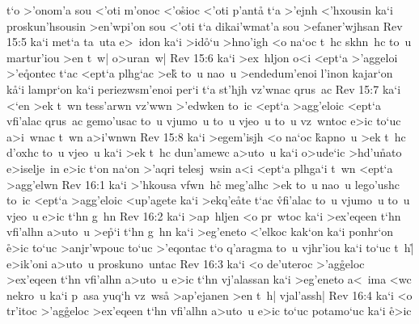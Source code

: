t`o
>'onom'a
sou
<'oti
m'onoc
<'o\r{s}ioc
<'oti
p'anta\r{}
t`a
>'ejnh
<'hxousin
ka`i
proskun'hsousin
>en'wpi'on
sou
<'oti
t`a
dikai'wmat'a
sou
>efaner'wjhsan\bibvsend
\vs Rev 15:5
ka`i
met`a
ta~uta
e>~idon
ka`i
>id\r{o}`u
>hno'igh
<o
na`oc
t~hc
skhn~hc
to~u
martur'iou
>en
t~w|
o>uran~w|\bibvsend
\vs Rev 15:6
ka`i
>ex~hljon
o<i
<ept`a
>'aggeloi
>'e\r{q}ontec
t`ac
<ept`a
plhg`ac
>ek\r{}
to~u
nao~u
>endedum'enoi
l'inon
kajar`on
k\r{a}`i
lampr`on
ka`i
periezwsm'enoi
per`i
t`a
st'hjh
vz'wnac
qrus~ac\bibvsend
\vs Rev 15:7
ka`i
<`en
>ek
t~wn
tess'arwn
vz'wwn
>'edwken
to~ic
<ept`a
>agg'eloic
<ept`a
vfi'alac
qrus~ac
gemo'usac
to~u
vjumo~u
to~u
vjeo~u
to~u
vz~wntoc
e>ic
to`uc
a>i~wnac
t~wn
a>i'wnwn\bibvsend
\vs Rev 15:8
ka`i
>egem'isjh
<o
na`oc
\r{k}apno~u
>ek
t~hc
d'oxhc
to~u
vjeo~u
ka`i
>ek
t~hc
dun'amewc
a>uto~u
ka`i
o>ude`ic
>hd'u\r{n}ato
e>iselje~in
e>ic
t`on
na`on
>'aqri
telesj~wsin
a<i
<ept`a
plhga`i
t~wn
<ept`a
>agg'elwn\bibvsend
\vs Rev 16:1
ka`i
>'hkousa
vfwn~hc\r{}
meg'alhc
>ek
to~u
nao~u
lego'ushc
to~ic
<ept`a
>agg'eloic
<up'agete
ka`i
>ekq'e\r{a}te
t`ac
\r{vf}i'alac
to~u
vjumo~u
to~u
vjeo~u
e>ic
t`hn
g~hn\bibvsend
\vs Rev 16:2
ka`i
>ap~hljen
<o
pr~wtoc
ka`i
>ex'eqeen
t`hn
vfi'alhn
a>uto~u
>e\r{p}`i
t`hn
g~hn
ka`i
>eg'eneto
<'elkoc
kak`on
ka`i
ponhr`on
\r{e}>ic
to`uc
>anjr'wpouc
to`uc
>'eqontac
t`o
q'aragma
to~u
vjhr'iou
ka`i
to`uc
t~h|\r{}
e>ik'oni
a>uto~u
proskuno~untac\bibvsend
\vs Rev 16:3
ka`i
<o
de'uteroc
>'ag\r{g}eloc
>ex'eqeen
t`hn
vfi'alhn
a>uto~u
e>ic
t`hn
vj'alassan
ka`i
>eg'eneto
a<~ima
<wc
nekro~u
ka`i
p~asa
yuq`h
vz~wsa\r{}
>ap'ejanen
>en
t~h|
vjal'assh|\bibvsend
\vs Rev 16:4
ka`i
<o
tr'itoc
>'ag\r{g}eloc
>ex'eqeen
t`hn
vfi'alhn
a>uto~u
e>ic
to`uc
potamo`uc
ka`i
\r{e}>ic
